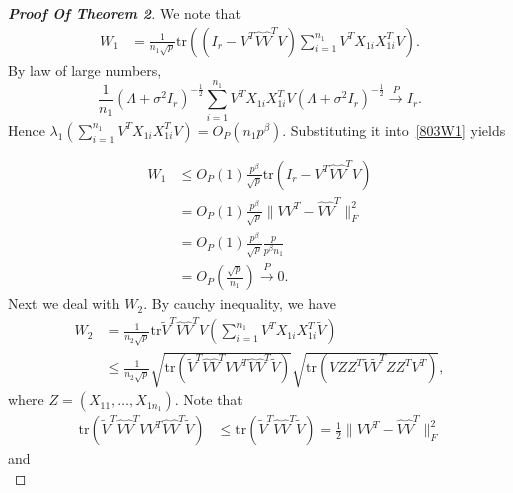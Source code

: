 \begin{proof}[\textbf{Proof Of Theorem 2}]
We note that
    \begin{equation}\label{803W1}
        \begin{aligned}
            W_1&=\frac{1}{n_1\sqrt{p}}\mathrm{tr} ((I_r-V^T\hat{V}\hat{V}^T V)\sum_{i=1}^{n_1}V^T X_{1i}X_{1i}^T V).
        \end{aligned}
    \end{equation}
By law of large numbers, 
\begin{equation*}
\frac{1}{n_1}{(\Lambda+\sigma^2 I_{r})}^{-\frac{1}{2}}\sum_{i=1}^{n_1}V^T X_{1i}X_{1i}^T V {(\Lambda+\sigma^2 I_{r})}^{-\frac{1}{2}}\xrightarrow{P}I_{r}.
\end{equation*}
Hence $\lambda_1(\sum_{i=1}^{n_1}V^T X_{1i}X_{1i}^T V )=O_P(n_1 p^{\beta})$. Substituting it into~\eqref{803W1} yields

\begin{equation}\label{myW1}
    \begin{aligned}
        W_1&\leq O_P(1)\frac{p^{\beta}}{\sqrt{p}}\mathrm{tr}(I_r-V^T \hat{V}\hat{V}^T V)\\
        &=O_P(1)\frac{p^{\beta}}{\sqrt{p}}\|VV^T -\hat{V}\hat{V}^T\|^2_F\\
        &=O_P(1)\frac{p^\beta}{\sqrt{p}}\frac{p}{p^\beta n_1}\\
        &=O_P(\frac{\sqrt{p}}{n_1})\xrightarrow{P}0.
    \end{aligned}
\end{equation}
 Next we deal with $W_2$. By cauchy inequality, we have
\begin{equation*}
    \begin{aligned}
        W_2 &=\frac{1}{n_2 \sqrt{p}}\mathrm{tr} \tilde{V}^T \hat{V}\hat{V}^T V (\sum_{i=1}^{n_1}V^T X_{1i}X_{1i}^T \tilde{V})\\
        &\leq \frac{1}{n_2 \sqrt{p}}\sqrt{\mathrm{tr}(\tilde{V}^T \hat{V}\hat{V}^T VV^T \hat{V}\hat{V}^T \tilde{V})}\sqrt{\mathrm{tr}(VZZ^T \tilde{V}\tilde{V}^T ZZ^T V^T)},
    \end{aligned}
\end{equation*}
where $Z=(X_{11},\ldots,X_{1n_1})$. Note that
\begin{equation*}
    \begin{aligned}
        \mathrm{tr}(\tilde{V}^T \hat{V}\hat{V}^T VV^T \hat{V}\hat{V}^T \tilde{V})&\leq \mathrm{tr} (\tilde{V}^T\hat{V}\hat{V}^T\tilde{V})=\frac{1}{2}\|VV^T-\hat{V}\hat{V}^T\|^2_F
    \end{aligned}
\end{equation*}
and
\begin{equation*}

\end{equation*}
\end{proof}
